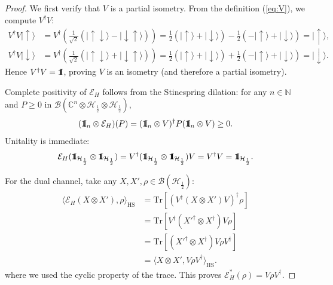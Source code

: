 \documentclass[12pt,a4paper]{article}
\def\id{{\bf 1}\!\!{\rm I}}
\begin{document}
\begin{proof}%
We first verify that $V$ is a partial isometry. From the definition (\ref{eq:V}), we compute $V^\dagger V$:
\begin{align*}
V^\dagger V |\uparrow\rangle &= V^\dagger\left( \frac{1}{\sqrt{2}}(|\uparrow\downarrow\rangle - |\downarrow\uparrow\rangle) \right)
= \frac{1}{2}(|\uparrow\rangle + |\downarrow\rangle) - \frac{1}{2}(-|\uparrow\rangle + |\downarrow\rangle) = |\uparrow\rangle, \\
V^\dagger V |\downarrow\rangle &= V^\dagger\left( \frac{1}{\sqrt{2}}(|\uparrow\downarrow\rangle + |\downarrow\uparrow\rangle) \right)
= \frac{1}{2}(|\uparrow\rangle + |\downarrow\rangle) + \frac{1}{2}(-|\uparrow\rangle + |\downarrow\rangle) = |\downarrow\rangle.
\end{align*}
Hence $V^\dagger V = \id$, proving $V$ is an isometry (and therefore a partial isometry).

Complete positivity of $\mathcal{E}_H$ follows from the Stinespring dilation: for any $n \in \mathbb{N}$ and $P \geq 0$ in $\mathcal{B}(\mathbb{C}^n \otimes \mathcal{H}_{\frac{1}{2}} \otimes \mathcal{H}_{\frac{1}{2}})$,
\[
(\id_n \otimes \mathcal{E}_H)(P) = (\id_n \otimes V)^\dagger P (\id_n \otimes V) \geq 0.
\]
Unitality is immediate:
\[
\mathcal{E}_H(\id_{\mathcal{H}_{\frac{1}{2}}} \otimes \id_{\mathcal{H}_{\frac{1}{2}}}) = V^\dagger(\id_{\mathcal{H}_{\frac{1}{2}}} \otimes \id_{\mathcal{H}_{\frac{1}{2}}})V = V^\dagger V = \id_{\mathcal{H}_{\frac{1}{2}}}.
\]

For the dual channel, take any $X,X',\rho \in \mathcal{B}(\mathcal{H}_{\frac{1}{2}})$:
\begin{align*}
\langle \mathcal{E}_H(X \otimes X'), \rho \rangle_{\mathrm{HS}}
&= \mathrm{Tr}[(V^\dagger(X \otimes X')V)^\dagger \rho] \\
&= \mathrm{Tr}[V^\dagger(X'^\dagger \otimes X^\dagger)V\rho] \\
&= \mathrm{Tr}[(X'^\dagger \otimes X^\dagger)V\rho V^\dagger] \\
&= \langle X \otimes X', V\rho V^\dagger \rangle_{\mathrm{HS}}.
\end{align*}
where we used the cyclic property of the trace. This proves $\mathcal{E}_H^*(\rho) = V\rho V^\dagger$.


\end{proof}
\end{document}
